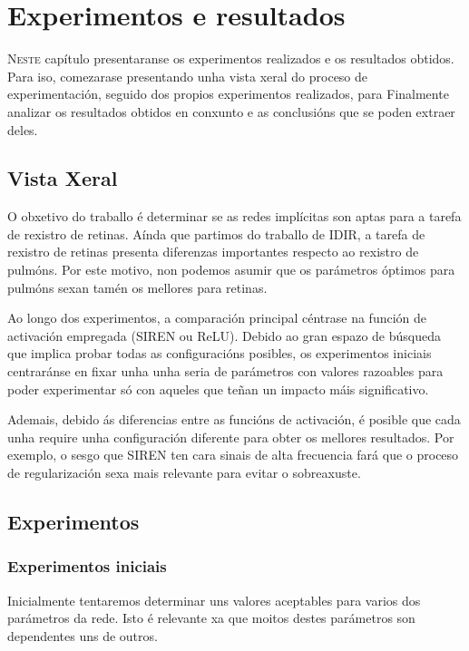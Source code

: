 \chapter{Experimentos e resultados}
\label{chap:Experimentos e resultados}
\lettrine{N}{este} capítulo presentaranse os experimentos realizados e os resultados obtidos.
Para iso, comezarase presentando unha vista xeral do proceso de experimentación, 
seguido dos propios experimentos realizados, para 
Finalmente analizar os resultados obtidos en conxunto e as conclusións que se poden extraer deles.

\section{Vista Xeral}
\label{sec:Vista Xeral}

O obxetivo do traballo é determinar se as redes implícitas son aptas para a tarefa de rexistro de retinas.
Aínda que partimos do traballo de IDIR, a tarefa de rexistro de retinas presenta diferenzas importantes respecto ao rexistro de pulmóns. Por este motivo, non podemos asumir que os parámetros óptimos para pulmóns sexan tamén os mellores para retinas.

Ao longo dos experimentos, a comparación principal céntrase na función de activación empregada (SIREN ou ReLU).
Debido ao gran espazo de búsqueda que implica probar todas as configuracións posibles, 
os experimentos iniciais centraránse en fixar unha unha seria de parámetros con valores razoables para poder experimentar só con aqueles que teñan un impacto máis significativo.

Ademais, debido ás diferencias entre as funcións de activación, é posible que cada unha require unha configuración diferente para obter os mellores resultados.
Por exemplo, o sesgo que SIREN ten cara sinais de alta frecuencia fará que o proceso de regularización sexa mais relevante para evitar o sobreaxuste.

\section{Experimentos}
\label{sec:Experimentos}

\subsection{Experimentos iniciais}
\label{subsec:Experimentos iniciais}

Inicialmente tentaremos determinar uns valores aceptables para varios dos parámetros da rede.
Isto é relevante xa que moitos destes parámetros son dependentes uns de outros.

